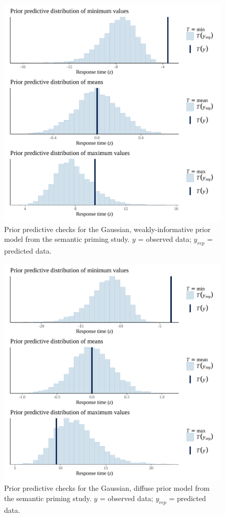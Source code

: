 \documentclass[
  12pt,
  man,floatsintext]{apa7}
\begin{document}
\begin{figure}

{\centering \includegraphics[width=0.8\linewidth]{../semanticpriming/bayesian_analysis/prior_predictive_checks/plots/semanticpriming_priorpredictivecheck_weaklyinformativepriors} 

}

\caption{Prior predictive checks for the Gaussian, weakly-informative prior model from the semantic priming study. \(y\) = observed data; \(y_{rep}\) = predicted data.}\label{fig:semanticpriming-priorpredictivecheck-weaklyinformativepriors}
\end{figure}



\begin{figure}

{\centering \includegraphics[width=0.8\linewidth]{../semanticpriming/bayesian_analysis/prior_predictive_checks/plots/semanticpriming_priorpredictivecheck_diffusepriors} 

}

\caption{Prior predictive checks for the Gaussian, diffuse prior model from the semantic priming study. \(y\) = observed data; \(y_{rep}\) = predicted data.}\label{fig:semanticpriming-priorpredictivecheck-diffusepriors}
\end{figure}
\end{document}
